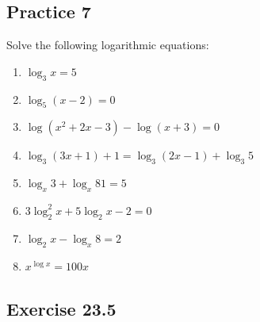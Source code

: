\documentclass[12pt]{report}
\begin{document}
\subsection*{Practice 7}

\setlength{\columnseprule}{1pt}
\setlength{\columnsep}{24pt}
\begin{multicols}{2}

  Solve the following logarithmic equations:
  \begin{enumerate}
    \item $\log_3 x=5$
    \item $\log_{5}(x-2)=0$
    \item $\log(x^{2}+2x-3)-\log(x+3)=0$
    \item $\log_{3}(3x+1)+1=\log_{3}(2x-1)+\log_{3}5$
    \item $\log_{x}3+\log_{x}81=5$
    \item $3\log_{2}^{2}x+5\log_{2}x-2=0$
    \item $\log_{2}x-\log_{x}8=2$
    \item $x^{\log x}=100x$
  \end{enumerate}

\end{multicols}

\subsection*{Exercise 23.5}
\end{document}
